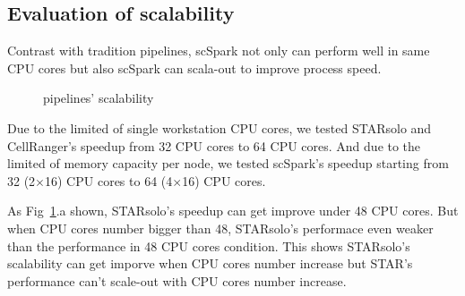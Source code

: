 \documentclass[conference]{IEEEtran}
\begin{document}
\subsection{Evaluation of scalability} 
Contrast with tradition pipelines, scSpark not only can perform well in same CPU cores but also scSpark can scala-out to improve process speed.
\begin{figure}
	\centering
	\caption{ pipelines' scalability }
	\label{fig3}
\end{figure}

Due to the limited of single workstation CPU cores, we tested STARsolo and CellRanger's speedup from 32 CPU cores to 64 CPU cores.
And due to the limited of memory capacity per node, we tested scSpark's speedup starting from 32 (2$\times$16) CPU cores to 64 (4$\times$16) CPU cores.

As Fig~\ref{fig3}.a shown, STARsolo's speedup can get improve under 48 CPU cores.
But when CPU cores number bigger than 48, STARsolo's performace even weaker than the performance in 48 CPU cores condition.
This shows STARsolo's scalability can get imporve when CPU cores number increase but STAR's performance can't scale-out with CPU cores number increase.
\end{document}
